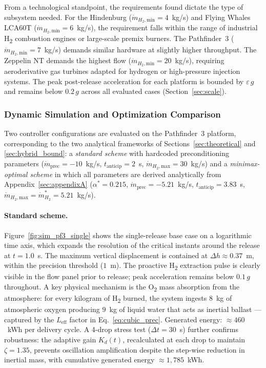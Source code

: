 \documentclass[applsci,article,submit,pdftex,moreauthors]{Definitions/mdpi}
\newcommand{\dotmmin}{\dot{m}_{H_2,\text{min}}}
\newcommand{\dotmmax}{\dot{m}_{H_2,\text{max}}}
\newcommand{\dotmstar}{\dot{m}_{H_2}^{*}}
\newcommand{\added}[1]{#1}
\begin{document}
From a technological standpoint, the requirements found dictate the type of subsystem needed. For the Hindenburg ($\dotmmin = 4$~kg/s) and Flying Whales LCA60T ($\dotmmin = 6$~kg/s), the requirement falls within the range of industrial H\textsubscript{2} combustion engines or large-scale premix burners. The Pathfinder~3 ($\dotmmin = 7$~kg/s) demands similar hardware at slightly higher throughput. The Zeppelin NT demands the highest flow ($\dotmmin = 20$~kg/s), requiring aeroderivative gas turbines adapted for hydrogen or high-pressure injection systems. \added{The peak post-release acceleration for each platform is bounded by $\varepsilon\,g$ and remains below $0.2\,g$ across all evaluated cases (Section~\ref{sec:scale}).}

\subsubsection{Dynamic Simulation and Optimization Comparison}
\label{sec:dynval}
\added{Two controller configurations are evaluated on the Pathfinder~3 platform, corresponding to the two analytical frameworks of Sections~\ref{sec:theoretical} and \ref{sec:hybrid_bound}: a \emph{standard scheme} with hardcoded preconditioning parameters ($\dot{m}_\text{prec}{=}{-10}$~kg/s, $t_\text{anticip}{=}2$~s, $\dotmmax{=}30$~kg/s) and a \emph{minimax-optimal scheme} in which all parameters are derived analytically from Appendix~\ref{sec:appendixA} ($\alpha^*{=}0.215$, $\dot{m}_\text{prec}{=}{-5.21}$~kg/s, $t_\text{anticip}{=}3.83$~s, $\dotmmax{=}\dotmstar{=}5.21$~kg/s).}

\paragraph{Standard scheme.}
\added{Figure~\ref{fig:sim_pf3_single} shows the single-release base case on a logarithmic time axis, which expands the resolution of the critical instants around the release at $t = 1.0$~s. The maximum vertical displacement is contained at $\Delta h \approx 0.37$~m, within the precision threshold ($1$~m). The proactive H\textsubscript{2} extraction pulse is clearly visible in the flow panel prior to release; peak acceleration remains below $0.1\,g$ throughout. A key physical mechanism is the O\textsubscript{2} mass absorption from the atmosphere: for every kilogram of H\textsubscript{2} burned, the system ingests $8$~kg of atmospheric oxygen producing $9$~kg of liquid water that acts as inertial ballast --- captured by the $L_\text{eff}$ factor in Eq.~\eqref{eq:cubic_prec}. Generated energy: ${\approx}460$~kWh per delivery cycle. A 4-drop stress test ($\Delta t = 30$~s) further confirms robustness: the adaptive gain $K_d(t)$, recalculated at each drop to maintain $\zeta = 1.35$, prevents oscillation amplification despite the step-wise reduction in inertial mass, with cumulative generated energy ${\approx}1{,}785$~kWh.}
\end{document}

